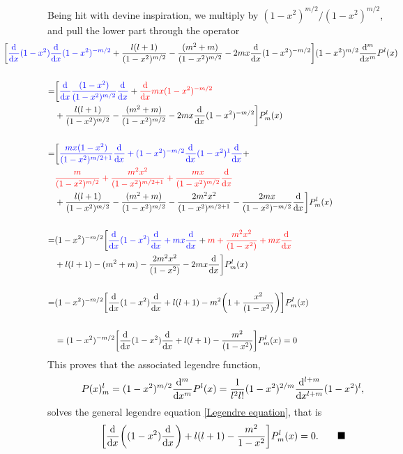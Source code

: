 \documentclass{article}
\begin{document}
    Being hit with devine inspiration, we multiply by \((1 - x^2)^{m/2} / (1 - x^2)^{m/2}\), and pull the lower part through the operator
    \begin{align*}
        & \hspace{-60pt} \bigg[ 
            \textcolor{blue}{\d[x] (1 - x^2) \d[x] (1 - x^2)^{-m/2}} + 
            \frac{l(l + 1)}{(1 - x^2)^{m/2}} - \frac{(m^2 + m)}{(1 - x^2)^{m/2}} - 2mx\d[x] (1 - x^2)^{-m/2} \bigg] 
            (1 - x^2)^{m/2}\d[x]m P^l(x)
        \\
        \\ 
        = & \bigg[ 
            \textcolor{blue}{\d[x] \frac{(1 - x^2)}{(1 - x^2)^{m/2}} \d[x] } + 
            \textcolor{red}{\d[x] mx (1 - x^2)^{-m/2}} 
        \\ & + \frac{l(l + 1)}{(1 - x^2)^{m/2}}
            - \frac{(m^2 + m)}{(1 - x^2)^{m/2}} - 
            2mx\d[x] (1 - x^2)^{-m/2} \bigg] 
             P^l_m(x)
        \\
        \\
        = & \bigg[ 
            \textcolor{blue}{\frac{mx(1 - x^2)}{(1 - x^2)^{m/2 + 1}}\d[x] + (1 - x^2)^{-m/2} \d[x] (1 - x^2)^{1}\d[x] } + 
        \\ & \textcolor{red}{\frac{m}{(1 - x^2)^{m/2}} + \frac{m^2x^2}{(1 - x^2)^{m/2 +1}} + \frac{mx} {(1 - x^2)^{m/2}}\d[x] } 
        \\ & + \frac{l(l + 1)}{(1 - x^2)^{m/2}} - 
            \frac{(m^2 + m)}{(1 - x^2)^{m/2}} - 
            \frac{2m^2x^2}{(1 - x^2)^{m/2 + 1}} -
            \frac{2mx} {(1 - x^2)^{-m/2}}\d[x] \bigg] 
            P^l_m(x)
        \\
        \\
        = & (1 - x^2)^{-m/2} \bigg[ 
            \textcolor{blue}{\d[x] (1 - x^2)\d[x] + mx \d[x] } + 
            \textcolor{red}{m + \frac{m^2x^2}{(1 - x^2)} + mx \d[x] } 
        \\ & + l(l + 1)  - (m^2 + m) -
            \frac{2m^2x^2}{(1 - x^2)} - 2mx\d[x] \bigg] 
            P^l_m(x)
        \\
        \\
        = & (1 - x^2)^{-m/2} \bigg[ 
            \d[x] (1 - x^2)\d[x]  +
            l(l + 1) - m^2 \bigg( 1 +
            \frac{x^2}{(1 - x^2)} \bigg)\bigg] 
            P^l_m(x)
        \\
        \\
        & = (1 - x^2)^{-m/2} \bigg[ 
            \d[x] (1 - x^2)\d[x] + l(l + 1) -
            \frac{m^2}{(1 - x^2)} \bigg] 
            P^l_m(x) = 0
    \end{align*}
    This proves that the associated legendre function,
    \begin{equation*}
        P(x)^l_m = (1 - x^2)^{m/2}\d[x]m P^l(x) = \frac{1}{l^2 l!}(1 - x^2)^{{2}/{m}} \d[x]{l + m} (1 - x^2)^l,
    \end{equation*}
    solves the general legendre equation \eqref{Legendre equation}, that is
    \begin{equation*}
        \bigg[\d[x] \bigg( (1 - x^2) \d[x] \bigg)+ l(l + 1)  - \frac{m^2}{1 - x^2} \bigg] P^l_m(x) = 0.     
        \quad \quad \qedsymbol
    \end{equation*}
\end{document}
